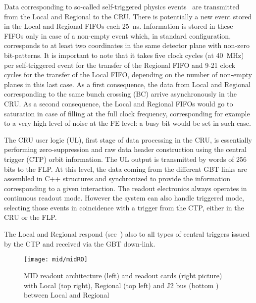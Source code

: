 Data corresponding to so-called self-triggered physics events~\cite{mid:ROweb,mid:DataNote} are transmitted from the Local and Regional to the CRU. There is potentially a new event stored 
in the Local and Regional FIFOs each 25~ns. Information is stored in these FIFOs only in case of a non-empty event which, in standard configuration,
corresponds to at least two coordinates in the same detector plane with non-zero bit-patterns. 
It is important to note that it takes five clock cycles (at 40~MHz) per self-triggered event for the transfer of the Regional FIFO and 9-21 clock cycles for the transfer of the Local FIFO, depending on the
number of non-empty planes in this last case. As a first consequence, the data from Local and Regional corresponding to the same bunch crossing (BC) arrive asynchronously in the CRU. As a second consequence, the
Local and Regional FIFOs would go to saturation in case of filling at the full clock frequency, corresponding for example to a very high level of noise at the FE level: a busy bit would be set in such case.

The CRU user logic (UL), first stage of data processing in the CRU, is essentially performing zero-suppression and raw data header construction using the central trigger (CTP) orbit information. 
The UL output is transmitted by words of 256 bits to the FLP. At this level, the data coming from the different GBT links are assembled in C++ structures and synchronized to provide the information 
corresponding to a given interaction. The readout electronics always operates in continuous readout mode. However the system can also handle triggered mode, selecting those events in coincidence with a trigger from the CTP, either 
in the CRU or the FLP.

The Local and Regional respond (see~\cite{mid:ROweb}) also to all types of central triggers issued by the CTP and received via the GBT down-link. 




\begin{figure}
\centering 
\texttt{[image: mid/midRO]}
\caption{MID readout architecture (left) and readout cards (right picture) with Local (top right), Regional (top left) and J2 bus (bottom ) between Local and Regional}
\label{midRO}
\end{figure}





